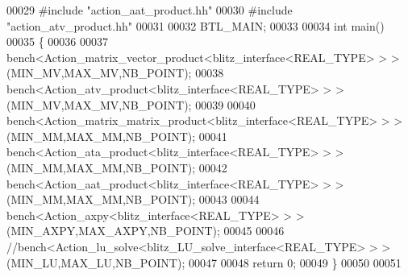 \begin{DoxyCode}
00029 \textcolor{preprocessor}{#include "action\_aat\_product.hh"}
00030 \textcolor{preprocessor}{#include "action\_atv\_product.hh"}
00031 
00032 BTL\_MAIN;
00033 
00034 \textcolor{keywordtype}{int} main()
00035 \{
00036 
00037   bench<Action\_matrix\_vector\_product<blitz\_interface<REAL\_TYPE> > >(MIN\_MV,MAX\_MV,NB\_POINT);
00038   bench<Action\_atv\_product<blitz\_interface<REAL\_TYPE> > >(MIN\_MV,MAX\_MV,NB\_POINT);
00039 
00040   bench<Action\_matrix\_matrix\_product<blitz\_interface<REAL\_TYPE> > >(MIN\_MM,MAX\_MM,NB\_POINT);
00041   bench<Action\_ata\_product<blitz\_interface<REAL\_TYPE> > >(MIN\_MM,MAX\_MM,NB\_POINT);
00042   bench<Action\_aat\_product<blitz\_interface<REAL\_TYPE> > >(MIN\_MM,MAX\_MM,NB\_POINT);
00043 
00044   bench<Action\_axpy<blitz\_interface<REAL\_TYPE> > >(MIN\_AXPY,MAX\_AXPY,NB\_POINT);
00045 
00046   \textcolor{comment}{//bench<Action\_lu\_solve<blitz\_LU\_solve\_interface<REAL\_TYPE> > >(MIN\_LU,MAX\_LU,NB\_POINT);}
00047 
00048   \textcolor{keywordflow}{return} 0;
00049 \}
00050 
00051 
\end{DoxyCode}
